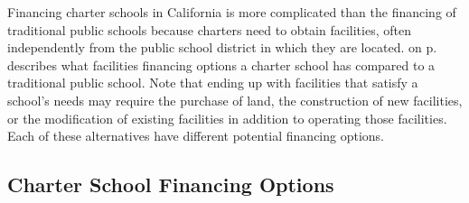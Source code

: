   Financing charter schools in California is more complicated than the financing of traditional public schools because charters need to obtain facilities, often independently from the public school district in which they are located.
 on p.\pageref{tab:charter-school-financing-options} describes what facilities financing options a charter school has compared to a traditional public school. Note that ending up with facilities that satisfy a school's needs may require the purchase of land, the construction of new facilities, or the modification of existing facilities in addition to operating those facilities. Each of these alternatives have different potential financing options.

\subsection{Charter School Financing Options}\indent\label{sec:charter-school-financing-options}

